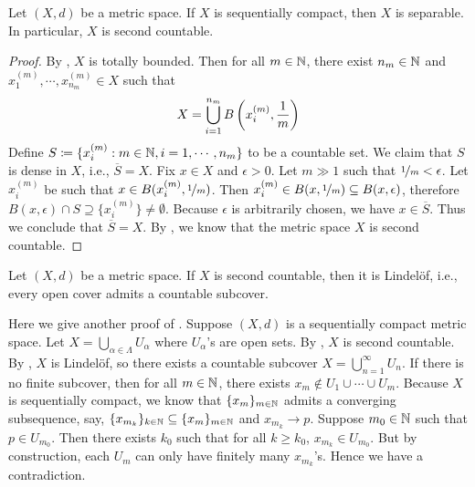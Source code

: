 \documentclass{techreport}
\begin{document}
\begin{proposition}\label{Prop:MetricSeqCompactImplySeparable}
	Let $(X,d)$ be a metric space.
	If $X$ is sequentially compact, then $X$ is separable.
	In particular, $X$ is second countable.
\end{proposition}
\begin{proof}
	By , $X$ is totally bounded.
	Then for all $m \in \mathbb{N}$, there exist $n_m \in \mathbb{N}$ and $x^{(m)}_1,\cdots,x^{(m)}_{n_m} \in X$ such that
	\[
	X = \bigcup_{i=1}^{n_m} B\left({ x^{(m)}_i, \frac{1}{m}}\right) 
	\]
	Define $S \coloneqq \{ x^{(m)}_i : m \in \mathbb{N}, i=1,\cdots,n_m \}$ to be a countable set.
	We claim that $S$ is dense in $X$, i.e., $\overline{S} = X$.
	Fix $x \in X$ and $\epsilon > 0$.
	Let $m \gg 1$ such that $\nicefrac{1}{m} < \epsilon$.
	Let $x^{(m)}_i$ be such that $x \in B(x^{(m)}_i, \nicefrac{1}{m})$.
	Then $x^{(m)}_i \in B(x,\nicefrac{1}{m}) \subseteq B(x,\epsilon)$, therefore $B(x,\epsilon) \cap S \supseteq \{ x^{(m)}_i \} \neq \emptyset$.
	Because $\epsilon$ is arbitrarily chosen, we have $x \in \overline{S}$.
	Thus we conclude that $\overline{S} = X$.
	By , we know that the metric space $X$ is second countable.
\end{proof}

\begin{proposition}\label{Prop:MetricSndCountImplyLindelof}
	Let $(X,d)$ be a metric space.
	If $X$ is second countable, then it is Lindel{\"o}f, i.e., every open cover admits a countable subcover.
\end{proposition}

\begin{remark}\label{Rem:AnotherProofMetricSeqCompactImplyCompact}
	Here we give another proof of .
	Suppose $(X,d)$ is a sequentially compact metric space.
	Let $X = \bigcup_{\alpha \in \Lambda} U_\alpha$ where $U_\alpha$'s are open sets.
	By , $X$ is second countable.
	By , $X$ is Lindel{\"o}f, so there exists a countable subcover $X = \bigcup_{n=1}^\infty U_n$.
	If there is no finite subcover, then for all $m \in \mathbb{N}$, there exists $x_m \not\in U_1 \cup \cdots \cup U_m$.
	Because $X$ is sequentially compact, we know that $\{x_m\}_{m \in \mathbb{N}}$ admits a converging subsequence, say, $\{x_{m_k}\}_{k \in \mathbb{N}} \subseteq \{ x_m \}_{m \in \mathbb{N}}$ and $x_{m_k} \rightarrow p$.
	Suppose $m_0 \in \mathbb{N}$ such that $p \in U_{m_0}$.
	Then there exists $k_0$ such that for all $k \ge k_0$, $x_{m_k} \in U_{m_0}$.
	But by construction, each $U_m$ can only have finitely many $x_{m_k}$'s.
	Hence we have a contradiction.
\end{remark}
\end{document}
